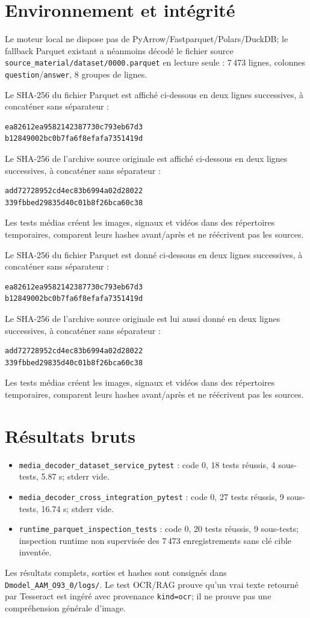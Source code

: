 \documentclass[11pt,a4paper]{report}
\begin{document}
\section{Environnement et intégrité}
Le moteur local ne dispose pas de PyArrow/Fastparquet/Polars/DuckDB; le fallback Parquet existant a néanmoins décodé le fichier source \texttt{source\_material/dataset/0000.parquet} en lecture seule : 7\,473 lignes, colonnes \texttt{question}/\texttt{answer}, 8 groupes de lignes.

Le SHA-256 du fichier Parquet est affiché ci-dessous en deux lignes successives, à concaténer sans séparateur :
\begin{lstlisting}
ea82612ea9582142387730c793eb67d3
b12849002bc0b7fa6f8efafa7351419d
\end{lstlisting}

Le SHA-256 de l’archive source originale est affiché ci-dessous en deux lignes successives, à concaténer sans séparateur :
\begin{lstlisting}
add72728952cd4ec83b6994a02d28022
339fbbed29835d40c01b8f26bca60c38
\end{lstlisting}
Les tests médias créent les images, signaux et vidéos dans des répertoires temporaires, comparent leurs hashes avant/après et ne réécrivent pas les sources.

Le SHA-256 du fichier Parquet est donné ci-dessous en deux lignes successives, à concaténer sans séparateur :
\begin{lstlisting}
ea82612ea9582142387730c793eb67d3
b12849002bc0b7fa6f8efafa7351419d
\end{lstlisting}

Le SHA-256 de l’archive source originale est lui aussi donné en deux lignes successives, à concaténer sans séparateur :
\begin{lstlisting}
add72728952cd4ec83b6994a02d28022
339fbbed29835d40c01b8f26bca60c38
\end{lstlisting}
Les tests médias créent les images, signaux et vidéos dans des répertoires temporaires, comparent leurs hashes avant/après et ne réécrivent pas les sources.
\section{Résultats bruts}
\begin{itemize}
\item \texttt{media\_decoder\_dataset\_service\_pytest} : code 0, 18 tests réussis, 4 sous-tests, 5.87 s; stderr vide.
\item \texttt{media\_decoder\_cross\_integration\_pytest} : code 0, 27 tests réussis, 9 sous-tests, 16.74 s; stderr vide.
\item \texttt{runtime\_parquet\_inspection\_tests} : code 0, 20 tests réussis, 9 sous-tests; inspection runtime non supervisée des 7\,473 enregistrements sans clé cible inventée.
\end{itemize}
Les résultats complets, sorties et hashes sont consignés dans \texttt{Dmodel\_AAM\_O93\_0/logs/}. Le test OCR/RAG prouve qu'un vrai texte retourné par Tesseract est ingéré avec provenance \texttt{kind=ocr}; il ne prouve pas une compréhension générale d'image.
\end{document}
